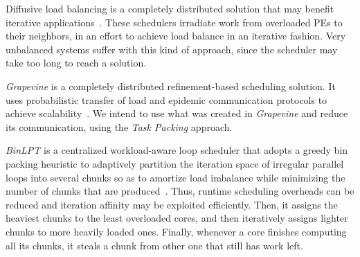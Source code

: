 Diffusive load balancing is a completely distributed solution that may benefit iterative applications~\cite{diffus}.
These schedulers irradiate work from overloaded PEs to their neighbors, in an effort to achieve load balance in an iterative fashion.
Very unbalanced systems suffer with this kind of approach, since the scheduler may take too long to reach a solution.

\textit{Grapevine} is a completely distributed refinement-based scheduling solution.
It uses probabilistic transfer of load and epidemic communication protocols to achieve scalability~\cite{grapevine}.
We intend to use what was created in \textit{Grapevine} and reduce its communication, using the \textit{Task Packing} approach.

\textit{BinLPT} is a centralized workload-aware loop scheduler that adopts a greedy bin packing heuristic to adaptively partition the iteration space of irregular parallel loops into several chunks so as to amortize load imbalance while minimizing the number of chunks that are produced~\cite{Castro-Penna-WSCAD:2017}. Thus, runtime scheduling overheads can be reduced and iteration affinity may be exploited efficiently. Then, it assigns the heaviest chunks to the least overloaded cores, and then iteratively assigns lighter chunks to more heavily loaded ones. Finally, whenever a core finishes computing all its chunks, it steals a chunk from other one that still has work left.


